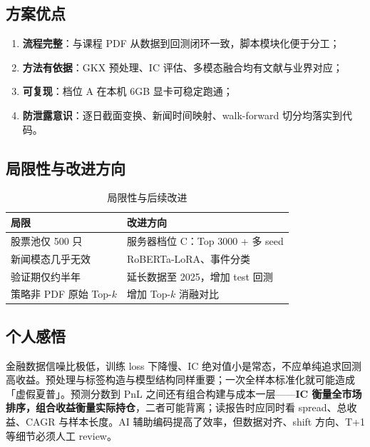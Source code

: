 \documentclass[UTF8,a4paper,12pt]{ctexart}
\begin{document}
\subsection{方案优点}

\begin{enumerate}[leftmargin=2em]
  \item \textbf{流程完整}：与课程 PDF 从数据到回测闭环一致，脚本模块化便于分工；
  \item \textbf{方法有依据}：GKX 预处理、IC 评估、多模态融合均有文献与业界对应；
  \item \textbf{可复现}：档位 A 在本机 6GB 显卡可稳定跑通；
  \item \textbf{防泄露意识}：逐日截面变换、新闻时间映射、walk-forward 切分均落实到代码。
\end{enumerate}

\subsection{局限性与改进方向}

\begin{table}[H]
\centering
\caption{局限性与后续改进}
\begin{tabular}{ll}
\toprule
\textbf{局限} & \textbf{改进方向} \\
\midrule
股票池仅 500 只     & 服务器档位 C：Top 3000 + 多 seed \\
新闻模态几乎无效   & RoBERTa-LoRA、事件分类 \\
验证期仅约半年     & 延长数据至 2025，增加 test 回测 \\
策略非 PDF 原始 Top-$k$ & 增加 Top-$k$ 消融对比 \\
\bottomrule
\end{tabular}
\end{table}

\subsection{个人感悟}

金融数据信噪比极低，训练 loss 下降慢、IC 绝对值小是常态，不应单纯追求回测高收益。预处理与标签构造与模型结构同样重要；一次全样本标准化就可能造成「虚假夏普」。预测分数到 PnL 之间还有组合构建与成本一层——\textbf{IC 衡量全市场排序，组合收益衡量实际持仓}，二者可能背离；读报告时应同时看 spread、总收益、CAGR 与样本长度。AI 辅助编码提高了效率，但数据对齐、shift 方向、T+1 等细节必须人工 review。

\end{document}
